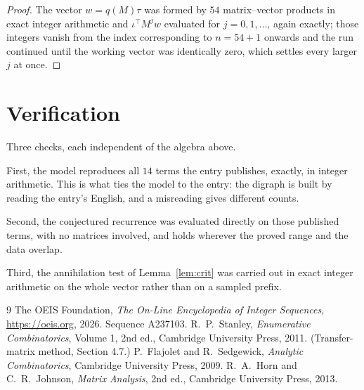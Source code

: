 \documentclass[11pt,a4paper]{article}
\theoremstyle{plain}
\theoremstyle{definition}
\begin{document}
\begin{proof}
The vector $w=q(M)\tau$ was formed by $54$ matrix--vector products in exact integer
arithmetic and $\iota^{\!\top}M^{j}w$ evaluated for $j=0,1,\dots$, again exactly; those
integers vanish from the index corresponding to $n=54+1$ onwards and the run continued
until the working vector was identically zero, which settles every larger $j$ at once.
\end{proof}

\section{Verification}

Three checks, each independent of the algebra above.

First, the model reproduces all $14$ terms the entry publishes, exactly, in integer
arithmetic. This is what ties the model to the entry: the digraph is built by reading the
entry's English, and a misreading gives different counts.

Second, the conjectured recurrence was evaluated directly on those published terms, with no
matrices involved, and holds wherever the proved range and the data overlap.

Third, the annihilation test of Lemma~\ref{lem:crit} was carried out in exact integer
arithmetic on the whole vector rather than on a sampled prefix.

\begin{thebibliography}{9}
 The OEIS Foundation, \emph{The On-Line Encyclopedia of Integer
Sequences}, \url{https://oeis.org}, 2026. Sequence A237103.
 R.~P.~Stanley, \emph{Enumerative Combinatorics}, Volume 1, 2nd ed.,
Cambridge University Press, 2011. (Transfer-matrix method, Section 4.7.)
 P.~Flajolet and R.~Sedgewick, \emph{Analytic Combinatorics}, Cambridge
University Press, 2009.
 R.~A.~Horn and C.~R.~Johnson, \emph{Matrix Analysis}, 2nd ed., Cambridge
University Press, 2013.
\end{thebibliography}
\end{document}
